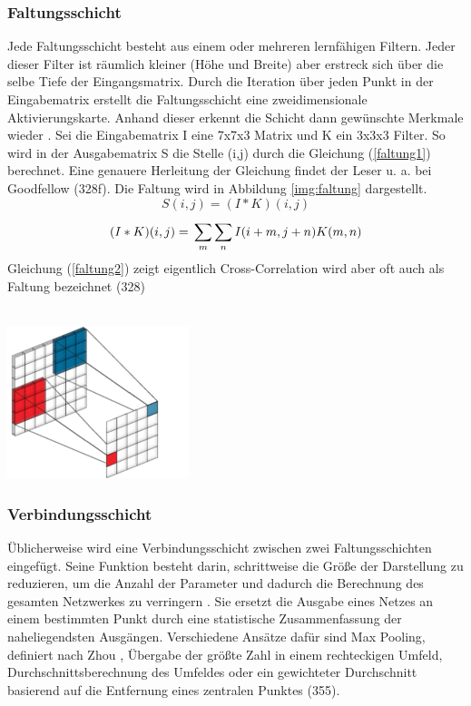 \documentclass[twosided,a4,10pt]{article}
\begin{document}
\begin{multicols}{2}
\subsubsection*{Faltungsschicht}
Jede Faltungsschicht besteht aus einem oder mehreren lernfähigen Filtern. Jeder dieser Filter ist räumlich kleiner (Höhe und Breite) aber erstreck sich über die selbe Tiefe der Eingangsmatrix. Durch die Iteration über jeden Punkt in der Eingabematrix erstellt die Faltungsschicht eine zweidimensionale Aktivierungskarte. Anhand dieser erkennt die Schicht dann gewünschte Merkmale wieder \cite{karpathy}.\newline
Sei die Eingabematrix I eine 7x7x3 Matrix und K ein 3x3x3 Filter. So wird in der Ausgabematrix S die Stelle (i,j) durch die Gleichung (\ref{faltung1}) berechnet. Eine genauere Herleitung der Gleichung findet der Leser u. a. bei Goodfellow \cite{goodfellow}(328f). Die Faltung wird in Abbildung \ref{img:faltung} dargestellt.
\begin{equation}\label{faltung1}
S(i,j) =(I \ast K)(i,j)
\end{equation}
\begin{equation}\label{faltung2}
(I \ast K)(i,j) =\newline\sum_{m}^{}\sum_{n}^{}I(i+m,j+n)K(m,n)
\end{equation}
Gleichung (\ref{faltung2}) zeigt eigentlich Cross-Correlation wird aber oft auch als Faltung bezeichnet \cite{goodfellow}(328)\\
\\
\begin{minipage}{0.45\textwidth}
	\centering
	\includegraphics{img/faltung-klein.png}
	\label{img:faltung}
\end{minipage}

\subsubsection*{Verbindungsschicht}
Üblicherweise wird eine Verbindungsschicht zwischen zwei Faltungsschichten eingefügt. Seine Funktion besteht darin, schrittweise die Größe der Darstellung zu reduzieren, um die Anzahl der Parameter und dadurch die Berechnung des gesamten Netzwerkes zu verringern \cite{karpathy}. Sie ersetzt die Ausgabe eines Netzes an einem bestimmten Punkt durch eine statistische Zusammenfassung der naheliegendsten Ausgängen. Verschiedene Ansätze dafür sind Max Pooling, definiert nach Zhou \cite{zhou}, Übergabe der größte Zahl in einem rechteckigen Umfeld, Durchschnittsberechnung des Umfeldes oder ein gewichteter Durchschnitt basierend auf die Entfernung eines zentralen Punktes \cite{goodfellow}(355).


\end{multicols}
\end{document}
